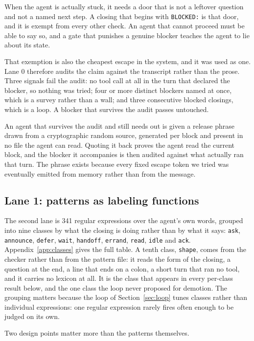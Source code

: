 When the agent is actually stuck, it needs a door that is not a leftover
question and not a named next step. A closing that begins with
\texttt{BLOCKED:} is that door, and it is exempt from every other check.
An agent that cannot proceed must be able to say so, and a gate that
punishes a genuine blocker teaches the agent to lie about its state.

That exemption is also the cheapest escape in the system, and it was used as
one. Lane 0 therefore audits the claim against the transcript rather than the
prose. Three signals fail the audit: no tool call at all in the turn that
declared the blocker, so nothing was tried; four or more distinct blockers named
at once, which is a survey rather than a wall; and three consecutive blocked
closings, which is a loop. A blocker that survives the audit passes untouched.

An agent that survives the audit and still needs out is given a release phrase
drawn from a cryptographic random source, generated per block and present in no
file the agent can read. Quoting it back proves the agent read the current
block, and the blocker it accompanies is then audited against what actually ran
that turn. The phrase exists because every fixed escape token we tried was
eventually emitted from memory rather than from the message.

\subsection{Lane 1: patterns as labeling functions}

The second lane is 341 regular expressions over the agent's own words, grouped
into nine classes by what the closing is doing rather than by what it says:
\texttt{ask}, \texttt{announce}, \texttt{defer}, \texttt{wait},
\texttt{handoff}, \texttt{errand}, \texttt{read}, \texttt{idle} and
\texttt{ack}. Appendix~\ref{app:classes} gives the full table. A tenth class,
\texttt{shape}, comes from the checker rather than from the pattern file: it
reads the form of the closing, a question at the end, a line that ends on a
colon, a short turn that ran no tool, and it carries no lexicon at all. It is
the class that appears in every per-class result below, and the one class the
loop never proposed for demotion. The grouping
matters because the loop of Section~\ref{sec:loop} tunes classes rather than
individual expressions: one regular expression rarely fires often enough to be
judged on its own.

Two design points matter more than the patterns themselves.

